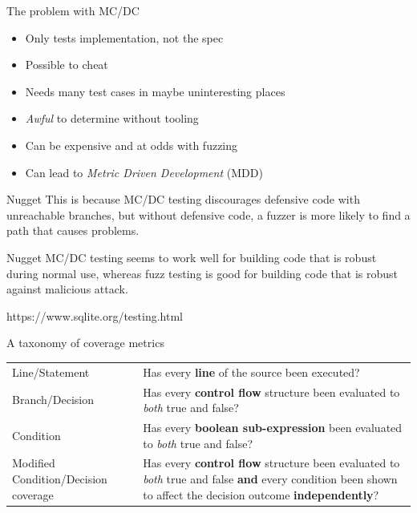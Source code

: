 \documentclass[xcolor = {dvipsnames, table}, aspectratio=169]{beamer}
\begin{document}
\begin{frame}
    The problem with MC/DC

    \begin{itemize}
        \item Only tests implementation, not the spec
        \item Possible to cheat
        \item Needs many test cases in maybe uninteresting places
        \item \emph{Awful} to determine without tooling
        \item Can be expensive and at odds with fuzzing
        \item Can lead to \emph{Metric Driven Development} (MDD)
    \end{itemize}
\end{frame}

\begin{frame}
    \begin{block}{Nugget}
        This is because MC/DC testing discourages defensive code with
        unreachable branches, but without defensive code, a fuzzer is more
        likely to find a path that causes problems.
    \end{block}

    \begin{block}{Nugget}
         MC/DC testing seems to work well for building code that is robust
         during normal use, whereas fuzz testing is good for building code that
         is robust against malicious attack.
    \end{block}

    \begin{block}{}
        https://www.sqlite.org/testing.html
    \end{block}
\end{frame}

\begin{frame}
    \begin{block}{A taxonomy of coverage metrics}
    \end{block}

    \begin{block}{}
        \begin{tabularx}{\textwidth}{l X}
            Line/Statement &
                Has every \textbf{line} of the source been executed? \\
            Branch/Decision &
                Has every \textbf{control flow} structure been evaluated to
                \emph{both} true and false? \\
            Condition &
                Has every \textbf{boolean sub-expression} been evaluated to
                \emph{both} true and false? \\
            Modified Condition/Decision coverage &
                Has every \textbf{control flow} structure been evaluated to
                \emph{both} true and false \textbf{and} every condition been shown
                to affect the decision outcome \textbf{independently}? \\
        \end{tabularx}
    \end{block}
\end{frame}
\end{document}
